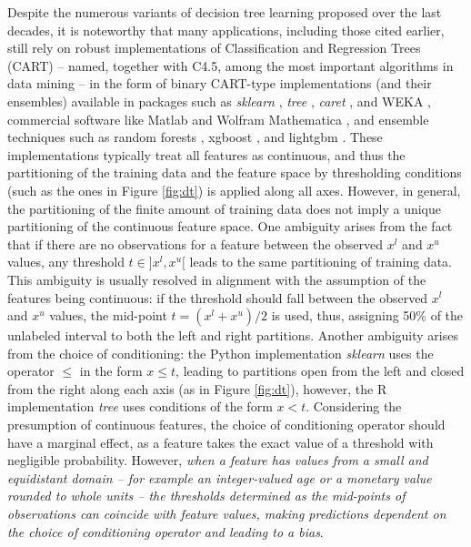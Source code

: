 \documentclass[5p,twocolumn,authoryear]{elsarticle}
\theoremstyle{plain}%
\theoremstyle{remark}%
\theoremstyle{definition}%
\begin{document}
Despite the numerous variants of decision tree learning proposed over the last decades, it is noteworthy that many applications, including those cited earlier, still rely on robust implementations of Classification and Regression Trees (CART) -- named, together with C4.5, among the most important algorithms in data mining \citep{top10} -- in the form of binary CART-type implementations (and their ensembles) available in packages such as \emph{sklearn} \citep{sklearn}, \emph{tree} \citep{tree}, \emph{caret} \citep{caret}, and WEKA \citep{weka}, commercial software like Matlab \citep{matlab} and Wolfram Mathematica \citep{mathematica}, and ensemble techniques such as random forests \citep{rf0}, xgboost \citep{xgboost}, and lightgbm \citep{lightgbm}. These implementations typically treat all features as continuous, and thus the partitioning of the training data and the feature space by thresholding conditions (such as the ones in Figure \ref{fig:dt}) is applied along all axes. However, in general, the partitioning of the finite amount of training data does not imply a unique partitioning of the continuous feature space. One ambiguity arises from the fact that if there are no observations for a feature between the observed $x^l$ and $x^u$ values, any threshold $t\in]x^l, x^u[$ leads to the same partitioning of training data. This ambiguity is usually resolved in alignment with the assumption of the features being continuous: if the threshold should fall between the observed $x^l$ and $x^u$ values, the mid-point $t=(x^l + x^u)/2$ is used, thus, assigning 50\% of the unlabeled interval to both the left and right partitions. Another ambiguity arises from the choice of conditioning: the Python implementation \emph{sklearn} \citep{sklearn} uses the operator $\leq$ in the form $x \leq t$, leading to partitions open from the left and closed from the right along each axis (as in Figure \ref{fig:dt}), however, the R implementation \emph{tree} \citep{tree} uses conditions of the form $x < t$. Considering the presumption of continuous features, the choice of conditioning operator should have a marginal effect, as a feature takes the exact value of a threshold with negligible probability. However, \emph{when a feature has values from a small and equidistant domain -- for example an integer-valued age or a monetary value rounded to whole units -- the thresholds determined as the mid-points of observations can coincide with feature values, making predictions dependent on the choice of conditioning operator and leading to a bias}.
\end{document}
